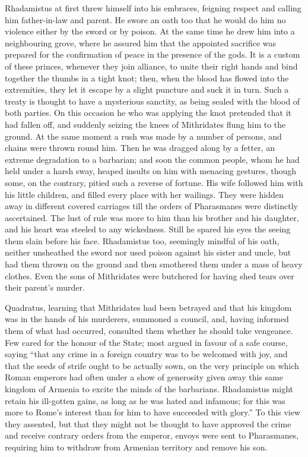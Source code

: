 
Rhadamistus at first threw himself into his embraces, feigning respect and calling him father-in-law and parent. He swore an oath too that he would do him no violence either by the sword or by poison. At the same time he drew him into a neighbouring grove, where he assured him that the appointed sacrifice was prepared for the confirmation of peace in the presence of the gods. It is a custom of these princes, whenever they join alliance, to unite their right hands and bind together the thumbs in a tight knot; then, when the blood has flowed into the extremities, they let it escape by a slight puncture and suck it in turn. Such a treaty is thought to have a mysterious sanctity, as being sealed with the blood of both parties. On this occasion he who was applying the knot pretended that it had fallen off, and suddenly seizing the knees of Mithridates flung him to the ground. At the same moment a rush was made by a number of persons, and chains were thrown round him. Then he was dragged along by a fetter, an extreme degradation to a barbarian; and soon the common people, whom he had held under a harsh sway, heaped insults on him with menacing gestures, though some, on the contrary, pitied such a reverse of fortune. His wife followed him with his little children, and filled every place with her wailings. They were hidden away in different covered carriages till the orders of Pharasmanes were distinctly ascertained. The lust of rule was more to him than his brother and his daughter, and his heart was steeled to any wickedness. Still he spared his eyes the seeing them slain before his face. Rhadamistus too, seemingly mindful of his oath, neither unsheathed the sword nor used poison against his sister and uncle, but had them thrown on the ground and then smothered them under a mass of heavy clothes. Even the sons of Mithridates were butchered for having shed tears over their parent's murder.


Quadratus, learning that Mithridates had been betrayed and that his kingdom was in the hands of his murderers, summoned a council, and, having informed them of what had occurred, consulted them whether he should take vengeance. Few cared for the honour of the State; most argued in favour of a safe course, saying ``that any crime in a foreign country was to be welcomed with joy, and that the seeds of strife ought to be actually sown, on the very principle on which Roman emperors had often under a show of generosity given away this same kingdom of Armenia to excite the minds of the barbarians. Rhadamistus might retain his ill-gotten gains, as long as he was hated and infamous; for this was more to Rome's interest than for him to have succeeded with glory.'' To this view they assented, but that they might not be thought to have approved the crime and receive contrary orders from the emperor, envoys were sent to Pharasmanes, requiring him to withdraw from Armenian territory and remove his son.

